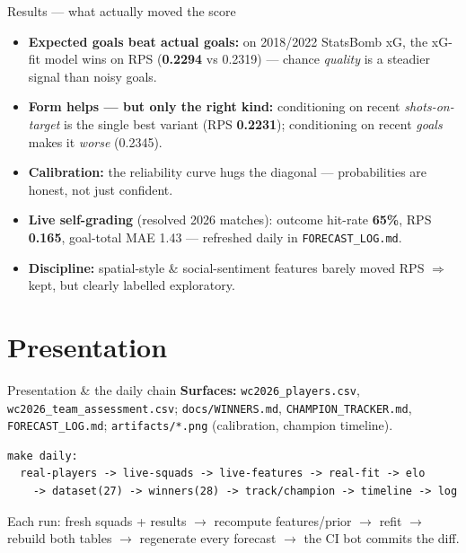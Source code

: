 \documentclass[aspectratio=169]{beamer}
\begin{document}
\begin{frame}{Results --- what actually moved the score}
\begin{itemize}\footnotesize
  \item \textbf{Expected goals beat actual goals:} on 2018/2022 StatsBomb xG,
        the xG-fit model wins on RPS (\textbf{0.2294} vs 0.2319) --- chance
        \emph{quality} is a steadier signal than noisy goals.
  \item \textbf{Form helps --- but only the right kind:} conditioning on recent
        \emph{shots-on-target} is the single best variant (RPS \textbf{0.2231});
        conditioning on recent \emph{goals} makes it \emph{worse} (0.2345).
  \item \textbf{Calibration:} the reliability curve hugs the diagonal ---
        probabilities are honest, not just confident.
  \item \textbf{Live self-grading} (resolved 2026 matches): outcome hit-rate
        \textbf{65\%}, RPS \textbf{0.165}, goal-total MAE 1.43 --- refreshed
        daily in \texttt{FORECAST\_LOG.md}.
  \item \textbf{Discipline:} spatial-style \& social-sentiment features barely
        moved RPS $\Rightarrow$ kept, but clearly labelled exploratory.
\end{itemize}
\end{frame}

\section{Presentation}

\begin{frame}[fragile]{Presentation \& the daily chain}
\textbf{Surfaces:} \texttt{wc2026\_players.csv}, \texttt{wc2026\_team\_assessment.csv};
\texttt{docs/WINNERS.md}, \texttt{CHAMPION\_TRACKER.md}, \texttt{FORECAST\_LOG.md};
\texttt{artifacts/*.png} (calibration, champion timeline).
\vspace{0.5em}
\begin{lstlisting}
make daily:
  real-players -> live-squads -> live-features -> real-fit -> elo
    -> dataset(27) -> winners(28) -> track/champion -> timeline -> log
\end{lstlisting}
\footnotesize Each run: fresh squads + results $\to$ recompute features/prior
$\to$ refit $\to$ rebuild both tables $\to$ regenerate every forecast $\to$ the
CI bot commits the diff.
\end{frame}
\end{document}
